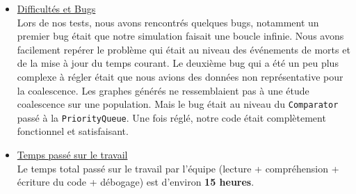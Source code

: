 \documentclass[11pt]{article}
\begin{document}
\begin{itemize}
		
		\item \underline{Difficultés et Bugs} \vspace{0.2cm}\\
		Lors de nos tests, nous avons rencontrés quelques bugs, notamment un premier bug était que notre simulation faisait une boucle infinie. Nous avons facilement repérer le problème qui était au niveau des événements de morts et de la mise à jour du temps courant. Le deuxième bug qui a été un peu plus complexe à régler était que nous avions des données non représentative pour la coalescence. Les graphes générés ne ressemblaient pas à une étude coalescence sur une population. Mais le bug était au niveau du \texttt{Comparator} passé à la \texttt{PriorityQueue}. Une fois réglé, notre code était complètement fonctionnel et satisfaisant.
		
		\item \underline{Temps passé sur le travail} \vspace{0.2cm}\\
		Le temps total passé sur le travail par l'équipe (lecture + compréhension + écriture du code + débogage) est d'environ \textbf{15 heures}.
		
	\end{itemize}	
	
	
	
\end{document}
